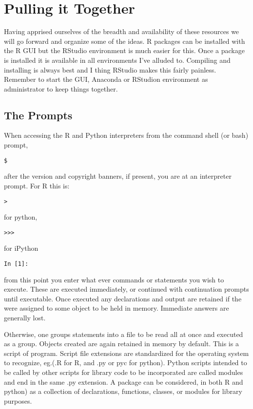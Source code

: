 \documentclass[]{book}
\theoremstyle{definition}
\theoremstyle{definition}
\theoremstyle{definition}
\theoremstyle{remark}
\begin{document}
\section{Pulling it Together}\label{pulling-it-together}

Having apprised ourselves of the breadth and availability of these
resources we will go forward and organize some of the ideas. R packages
can be installed with the R GUI but the RStudio environment is much
easier for this. Once a package is installed it is available in all
environments I've alluded to. Compiling and installing is always best
and I thing RStudio makes this fairly painless. Remember to start the
GUI, Anaconda or RStudion environment as administrator to keep things
together.

\subsection{The Prompts}\label{the-prompts}

When accessing the R and Python interpreters from the command shell (or
bash) prompt,

\begin{verbatim}
$
\end{verbatim}

after the version and copyright banners, if present, you are at an
interpreter prompt. For R this is:

\begin{verbatim}
>
\end{verbatim}

for python,

\begin{verbatim}
>>>
\end{verbatim}

for iPython

\begin{verbatim}
In [1]:
\end{verbatim}

from this point you enter what ever commands or statements you wish to
execute. These are executed immediately, or continued with continuation
prompts until executable. Once executed any declarations and output are
retained if the were assigned to some object to be held in memory.
Immediate answers are generally lost.

Otherwise, one groups statements into a file to be read all at once and
executed as a group. Objects created are again retained in memory by
default. This is a script of program. Script file extensions are
standardized for the operating system to recognize, eg.(.R for R, and
.py or pyc for python). Python scripts intended to be called by other
scripts for library code to be incorporated are called modules and end
in the same .py extension. A package can be considered, in both R and
python) as a collection of declarations, functions, classes, or modules
for library purposes.
\end{document}
